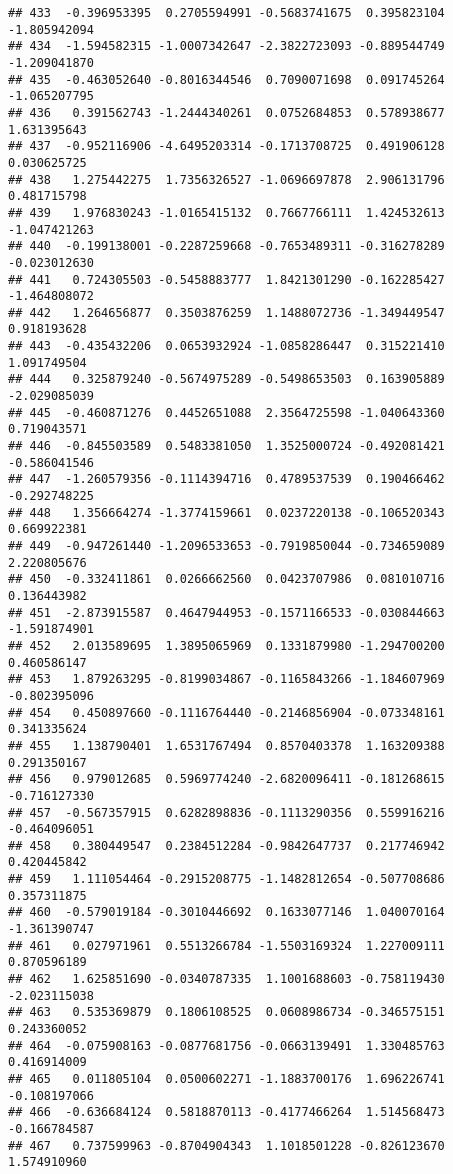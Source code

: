 \documentclass[
]{article}
\begin{document}
\begin{verbatim}
## 433  -0.396953395  0.2705594991 -0.5683741675  0.395823104 -1.805942094
## 434  -1.594582315 -1.0007342647 -2.3822723093 -0.889544749 -1.209041870
## 435  -0.463052640 -0.8016344546  0.7090071698  0.091745264 -1.065207795
## 436   0.391562743 -1.2444340261  0.0752684853  0.578938677  1.631395643
## 437  -0.952116906 -4.6495203314 -0.1713708725  0.491906128  0.030625725
## 438   1.275442275  1.7356326527 -1.0696697878  2.906131796  0.481715798
## 439   1.976830243 -1.0165415132  0.7667766111  1.424532613 -1.047421263
## 440  -0.199138001 -0.2287259668 -0.7653489311 -0.316278289 -0.023012630
## 441   0.724305503 -0.5458883777  1.8421301290 -0.162285427 -1.464808072
## 442   1.264656877  0.3503876259  1.1488072736 -1.349449547  0.918193628
## 443  -0.435432206  0.0653932924 -1.0858286447  0.315221410  1.091749504
## 444   0.325879240 -0.5674975289 -0.5498653503  0.163905889 -2.029085039
## 445  -0.460871276  0.4452651088  2.3564725598 -1.040643360  0.719043571
## 446  -0.845503589  0.5483381050  1.3525000724 -0.492081421 -0.586041546
## 447  -1.260579356 -0.1114394716  0.4789537539  0.190466462 -0.292748225
## 448   1.356664274 -1.3774159661  0.0237220138 -0.106520343  0.669922381
## 449  -0.947261440 -1.2096533653 -0.7919850044 -0.734659089  2.220805676
## 450  -0.332411861  0.0266662560  0.0423707986  0.081010716  0.136443982
## 451  -2.873915587  0.4647944953 -0.1571166533 -0.030844663 -1.591874901
## 452   2.013589695  1.3895065969  0.1331879980 -1.294700200  0.460586147
## 453   1.879263295 -0.8199034867 -0.1165843266 -1.184607969 -0.802395096
## 454   0.450897660 -0.1116764440 -0.2146856904 -0.073348161  0.341335624
## 455   1.138790401  1.6531767494  0.8570403378  1.163209388  0.291350167
## 456   0.979012685  0.5969774240 -2.6820096411 -0.181268615 -0.716127330
## 457  -0.567357915  0.6282898836 -0.1113290356  0.559916216 -0.464096051
## 458   0.380449547  0.2384512284 -0.9842647737  0.217746942  0.420445842
## 459   1.111054464 -0.2915208775 -1.1482812654 -0.507708686  0.357311875
## 460  -0.579019184 -0.3010446692  0.1633077146  1.040070164 -1.361390747
## 461   0.027971961  0.5513266784 -1.5503169324  1.227009111  0.870596189
## 462   1.625851690 -0.0340787335  1.1001688603 -0.758119430 -2.023115038
## 463   0.535369879  0.1806108525  0.0608986734 -0.346575151  0.243360052
## 464  -0.075908163 -0.0877681756 -0.0663139491  1.330485763  0.416914009
## 465   0.011805104  0.0500602271 -1.1883700176  1.696226741 -0.108197066
## 466  -0.636684124  0.5818870113 -0.4177466264  1.514568473 -0.166784587
## 467   0.737599963 -0.8704904343  1.1018501228 -0.826123670  1.574910960

\end{verbatim}
\end{document}
